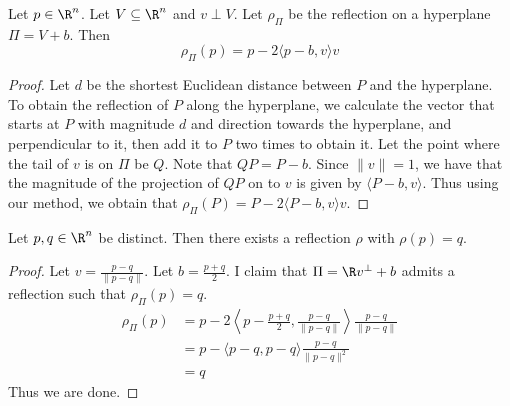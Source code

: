 \begin{lmm}{}{} Let $p\in\R^n$. Let $V\subseteq\R^n$ and $v\perp V$. Let $\rho_\Pi$ be the reflection on a hyperplane $\Pi=V+b$. Then $$\rho_\Pi(p)=p-2\langle p-b, v\rangle v$$\tcbline
\begin{proof}
Let $d$ be the shortest Euclidean distance between $P$ and the hyperplane. To obtain the reflection of $P$ along the hyperplane, we calculate the vector that starts at $P$ with magnitude $d$ and direction towards the hyperplane, and perpendicular to it, then add it to $P$ two times to obtain it. \linebreak\linebreak
Let the point where the tail of $v$ is on $\Pi$ be $Q$. Note that $QP=P-b$. Since $\|v\|=1$, we have that the magnitude of the projection of $QP$ on to $v$ is given by $\langle P-b,v\rangle$. Thus using our method, we obtain that $\rho_\Pi(P)=P-2\langle P-b,v\rangle v$. 
\end{proof}
\end{lmm}

\begin{lmm}{}{} Let $p,q\in\R^n$ be distinct. Then there exists a reflection $\rho$ with $\rho(p)=q$. \tcbline
\begin{proof}
Let $v=\frac{p-q}{\|p-q\|}$. Let $b=\frac{p+q}{2}$. I claim that $\Pi=\R v^\perp+b$ admits a reflection such that $\rho_\Pi(p)=q$. 
\begin{align*}
\rho_\Pi(p)&=p-2\left\langle p-\frac{p+q}{2},\frac{p-q}{\|p-q\|}\right\rangle \frac{p-q}{\|p-q\|}\\
&=p-\langle p-q,p-q\rangle\frac{p-q}{\|p-q\|^2}\\
&=q
\end{align*}
Thus we are done. 
\end{proof}
\end{lmm}

